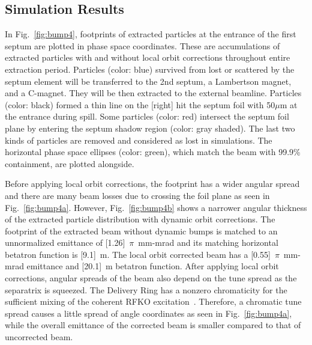 \documentclass[aps,prstab,onecolumn,preprint]{revtex4-1}
\begin{document}
\subsection{\label{sec:bump2}Simulation Results}

In Fig.~\ref{fig:bump4}, footprints of extracted particles at the entrance of the first septum are plotted in phase space coordinates. These are accumulations of extracted particles with and without local orbit corrections throughout entire extraction period. Particles (color: blue) survived from lost or scattered by the septum element will be transferred to the 2nd septum, a Lambertson magnet, and a C-magnet. They will be then extracted to the external beamline. Particles (color: black) formed a thin line on the [right] hit the septum foil with 50$\mu$m at the entrance during spill. Some particles (color: red) intersect the septum foil plane by entering the septum shadow region (color: gray shaded). The last two kinds of particles are removed and considered as lost in simulations. The horizontal phase space ellipses (color: green), which match the beam with 99.9\% containment, are plotted alongside.

Before applying local orbit corrections, the footprint has a wider angular spread and there are many beam losses due to crossing the foil plane as seen in Fig.~\ref{fig:bump4a}. However, Fig.~\ref{fig:bump4b} shows a narrower angular thickness of the extracted particle distribution with dynamic orbit corrections. The footprint of the extracted beam without dynamic bumps is matched to an unnormalized emittance of [1.26]~$\pi$~mm-mrad and its matching horizontal betatron function is [9.1]~m. The local orbit corrected beam has a [0.55]~$\pi$~mm-mrad emittance and [20.1]~m betatron function. After applying local orbit corrections, angular spreads of the beam also depend on the tune spread as the separatrix is squeezed. The Delivery Ring has a nonzero chromaticity for the sufficient mixing of the coherent RFKO excitation~\cite{ipac11}. Therefore, a chromatic tune spread causes a little spread of angle coordinates as seen in Fig.~\ref{fig:bump4a}, while the overall emittance of the corrected beam is smaller compared to that of uncorrected beam.
\end{document}
